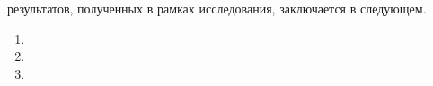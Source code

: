 {\novelty} результатов, полученных в рамках исследования, заключается в следующем.
\begin{enumerate}
  \item 
  \item 
  \item 
\end{enumerate}

{\influence}
%

